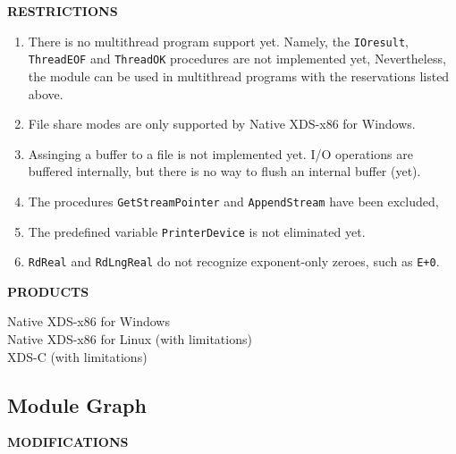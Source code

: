 {\bf RESTRICTIONS}

\begin{enumerate}
\item There is no multithread program support yet. Namely, the \verb'IOresult',
      \verb'ThreadEOF' and \verb'ThreadOK' procedures are not implemented yet,
      Nevertheless, the module can be used in multithread programs with the
      reservations listed above.

\item File share modes are only supported by Native XDS-x86 for Windows.

\item Assinging a buffer to a file is not implemented yet. I/O operations are
      buffered internally, but there is no way to flush an internal buffer (yet).

\item The procedures \verb'GetStreamPointer' and \verb'AppendStream' 
      have been excluded,

\item The predefined variable \verb'PrinterDevice' is not eliminated yet.

\item \verb'RdReal' and \verb'RdLngReal' do not recognize exponent-only zeroes,
      such as \verb'E+0'.
\end{enumerate}

{\bf PRODUCTS}

Native XDS-x86 for Windows\\
Native XDS-x86 for Linux (with limitations)\\
XDS-C (with limitations)


\subsection{Module Graph}

{\bf MODIFICATIONS}

